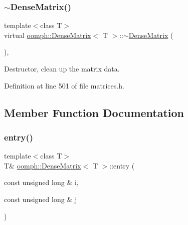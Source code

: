 \mbox{\label{classoomph_1_1DenseMatrix_a673e04c72174ec084e56ad5f53ba51da}} 
\subsubsection{\texorpdfstring{$\sim$\+Dense\+Matrix()}{~DenseMatrix()}}
{\footnotesize\ttfamily template$<$class T$>$ \\
virtual \hyperlink{classoomph_1_1DenseMatrix}{oomph\+::\+Dense\+Matrix}$<$ T $>$\+::$\sim$\hyperlink{classoomph_1_1DenseMatrix}{Dense\+Matrix} (\begin{DoxyParamCaption}{ }\end{DoxyParamCaption})\hspace{0.3cm}{\ttfamily [inline]}, {\ttfamily [virtual]}}



Destructor, clean up the matrix data. 



Definition at line 501 of file matrices.\+h.



\subsection{Member Function Documentation}
\mbox{\label{classoomph_1_1DenseMatrix_a0260bf942b1ca7d05515bda03acfe8ec}} 
\subsubsection{\texorpdfstring{entry()}{entry()}}
{\footnotesize\ttfamily template$<$class T$>$ \\
T\& \hyperlink{classoomph_1_1DenseMatrix}{oomph\+::\+Dense\+Matrix}$<$ T $>$\+::entry (\begin{DoxyParamCaption}\item[{const unsigned long \&}]{i,  }\item[{const unsigned long \&}]{j }\end{DoxyParamCaption})\hspace{0.3cm}{\ttfamily [inline]}}



